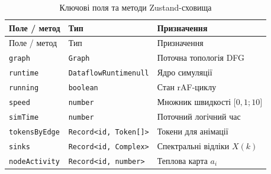 \documentclass[
]{article}
\begin{document}
\begin{longtable}[]{@{}
  >{\raggedright\arraybackslash}p{}
  >{\raggedright\arraybackslash}p{}
  >{\raggedright\arraybackslash}p{}@{}}
\caption{Ключові поля та методи Zustand-сховища}\tabularnewline
\toprule\noalign{}
\begin{minipage}[b]{\linewidth}\raggedright
Поле / метод
\end{minipage} & \begin{minipage}[b]{\linewidth}\raggedright
Тип
\end{minipage} & \begin{minipage}[b]{\linewidth}\raggedright
Призначення
\end{minipage} \\
\midrule\noalign{}
\endfirsthead
\toprule\noalign{}
\begin{minipage}[b]{\linewidth}\raggedright
Поле / метод
\end{minipage} & \begin{minipage}[b]{\linewidth}\raggedright
Тип
\end{minipage} & \begin{minipage}[b]{\linewidth}\raggedright
Призначення
\end{minipage} \\
\midrule\noalign{}
\endhead
\bottomrule\noalign{}
\endlastfoot
\texttt{graph} & \texttt{Graph} & Поточна топологія DFG \\
\texttt{runtime} &
\texttt{DataflowRuntime}\texttt{\textbar{}}\texttt{null} & Ядро симуляції \\
\texttt{running} & \texttt{boolean} & Стан rAF-циклу \\
\texttt{speed} & \texttt{number} & Множник швидкості
\(\lbrack 0,1;10\rbrack\) \\
\texttt{simTime} & \texttt{number} & Поточний логічний час \\
\texttt{tokensByEdge} &
\texttt{Record}\texttt{\textless{}}\texttt{id}\texttt{,\ }\texttt{Token}\texttt{{[}{]}\textgreater{}}
& Токени для анімації \\
\texttt{sinks} &
\texttt{Record}\texttt{\textless{}}\texttt{id}\texttt{,\ }\texttt{Complex}\texttt{\textgreater{}}
& Спектральні відліки \(X(k)\) \\
\texttt{nodeActivity} &
\texttt{Record}\texttt{\textless{}}\texttt{id}\texttt{,\ }\texttt{number}\texttt{\textgreater{}}
& Теплова карта \(a_{i}\) \\

\end{longtable}
\end{document}
